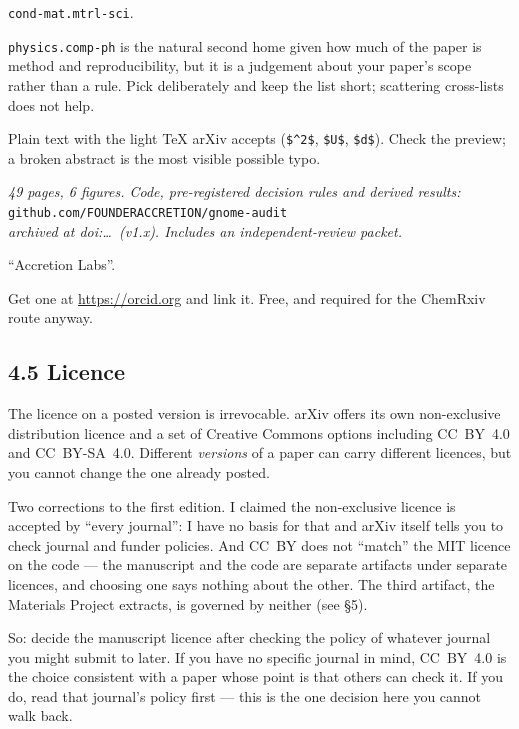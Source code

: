\documentclass[11pt]{article}
\begin{document}
\begin{description}[nosep,leftmargin=2.4em]
\item[Primary] \texttt{cond-mat.mtrl-sci}.
\item[Cross-list] \texttt{physics.comp-ph} is the natural second home given how much of
      the paper is method and reproducibility, but it is a judgement about your paper's
      scope rather than a rule. Pick deliberately and keep the list short; scattering
      cross-lists does not help.
\item[Abstract] Plain text with the light TeX arXiv accepts (\texttt{\$\^{}2\$},
      \texttt{\$U\$}, \texttt{\$d\$}). Check the preview; a broken abstract is the most
      visible possible typo.
\item[Comments] \emph{49 pages, 6 figures. Code, pre-registered decision rules and
      derived results:}\\
      \texttt{github.com/FOUNDERACCRETION/gnome-audit}\\
      \emph{archived at doi:…\ (v1.x). Includes an independent-review packet.}
\item[Affiliation] ``Accretion Labs''.
\item[ORCID] Get one at \url{https://orcid.org} and link it. Free, and required for the
      ChemRxiv route anyway.
\end{description}

\subsection*{4.5 Licence}

The licence on a posted version is irrevocable. arXiv offers its own non-exclusive
distribution licence and a set of Creative Commons options including CC~BY~4.0 and
CC~BY-SA~4.0. Different \emph{versions} of a paper can carry different licences, but you
cannot change the one already posted.

Two corrections to the first edition. I claimed the non-exclusive licence is accepted by
``every journal'': I have no basis for that and arXiv itself tells you to check journal and
funder policies. And CC~BY does not ``match'' the MIT licence on the code --- the manuscript
and the code are separate artifacts under separate licences, and choosing one says nothing
about the other. The third artifact, the Materials Project extracts, is governed by neither
(see \S5).

So: decide the manuscript licence after checking the policy of whatever journal you might
submit to later. If you have no specific journal in mind, CC~BY~4.0 is the choice consistent
with a paper whose point is that others can check it. If you do, read that journal's policy
first --- this is the one decision here you cannot walk back.
\end{document}
